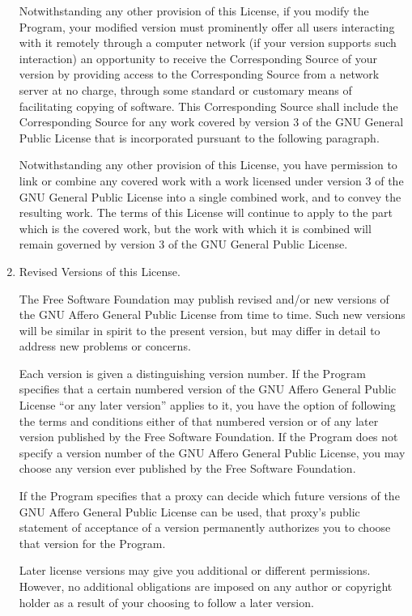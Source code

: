 \documentclass{article}%
\begin{document}
\begin{enumerate}
Notwithstanding any other provision of this License, if you modify the
Program, your modified version must prominently offer all users interacting
with it remotely through a computer network (if your version supports such
interaction) an opportunity to receive the Corresponding Source of your
version by providing access to the Corresponding Source from a network
server at no charge, through some standard or customary means of
facilitating copying of software.        This Corresponding Source shall include
the Corresponding Source for any work covered by version 3 of the GNU
General Public License that is incorporated pursuant to the following
paragraph.

Notwithstanding any other provision of this License, you have permission to
link or combine any covered work with a work licensed under version 3 of
the GNU General Public License into a single combined work, and to convey
the resulting work.      The terms of this License will continue to apply to
the part which is the covered work, but the work with which it is combined
will remain governed by version 3 of the GNU General Public License.

\item Revised Versions of this License.

The Free Software Foundation may publish revised and/or new versions of
the GNU Affero General Public License from time to time.        Such new versions will
be similar in spirit to the present version, but may differ in detail to
address new problems or concerns.

Each version is given a distinguishing version number.  If the
Program specifies that a certain numbered version of the GNU Affero General
Public License ``or any later version'' applies to it, you have the
option of following the terms and conditions either of that numbered
version or of any later version published by the Free Software
Foundation.      If the Program does not specify a version number of the
GNU Affero General Public License, you may choose any version ever published
by the Free Software Foundation.

If the Program specifies that a proxy can decide which future
versions of the GNU Affero General Public License can be used, that proxy's
public statement of acceptance of a version permanently authorizes you
to choose that version for the Program.

Later license versions may give you additional or different
permissions.    However, no additional obligations are imposed on any
author or copyright holder as a result of your choosing to follow a
later version.


\end{enumerate}
\end{document}
